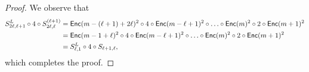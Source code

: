 \begin{proof}
We observe that
\begin{align*}
    S_{2\ell,\ell+1}^L\circ4\circ S_{2\ell,\ell}^{(\ell+1)} &= \mathsf{Enc}(m-(\ell+1)+2\ell)^2\circ4\circ\mathsf{Enc}(m-\ell+1)^2\circ\ldots\circ\mathsf{Enc}(m)^2\circ2\circ\mathsf{Enc}(m+1)^2\\
    &=\mathsf{Enc}(m-1+\ell)^2\circ4\circ\mathsf{Enc}(m-\ell+1)^2\circ\ldots\circ\mathsf{Enc}(m)^2\circ2\circ\mathsf{Enc}(m+1)^2\\
    &=S_{\ell,1}^L\circ4\circ S_{\ell+1,\ell},
\end{align*}
which completes the proof.
\end{proof}